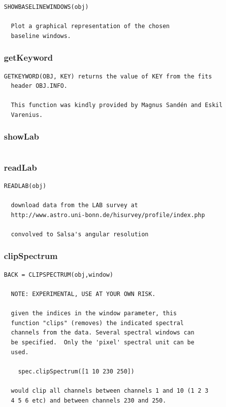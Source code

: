 \documentclass[11pt,a4paper]{article}
\begin{document}
\begin{lstlisting}[framerule=0pt]
  SHOWBASELINEWINDOWS(obj)
  
  Plot a graphical representation of the chosen
  baseline windows.
\end{lstlisting}


\subsubsection*{getKeyword}
\label{sec:getkeyword}

\begin{lstlisting}[framerule=0pt]
  GETKEYWORD(OBJ, KEY) returns the value of KEY from the fits
  header OBJ.INFO.  
  
  This function was kindly provided by Magnus Sandén and Eskil
  Varenius.
\end{lstlisting}


\subsubsection*{showLab}
\label{sec:showlab}

\begin{lstlisting}[framerule=0pt]

\end{lstlisting}


\subsubsection*{readLab}
\label{sec:readlab}

\begin{lstlisting}[framerule=0pt]
  READLAB(obj)
  
  download data from the LAB survey at
  http://www.astro.uni-bonn.de/hisurvey/profile/index.php
  
  convolved to Salsa's angular resolution
\end{lstlisting}

\subsubsection*{clipSpectrum}
\label{sec:clipspectrum}

\begin{lstlisting}[framerule=0pt]
  BACK = CLIPSPECTRUM(obj,window)
  
  NOTE: EXPERIMENTAL, USE AT YOUR OWN RISK.
  
  given the indices in the window parameter, this
  function "clips" (removes) the indicated spectral
  channels from the data. Several spectral windows can
  be specified.  Only the 'pixel' spectral unit can be
  used. 
  
    spec.clipSpectrum([1 10 230 250])
  
  would clip all channels between channels 1 and 10 (1 2 3
  4 5 6 etc) and between channels 230 and 250.
\end{lstlisting}
\end{document}
